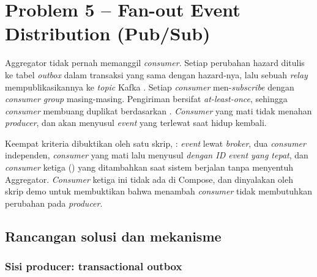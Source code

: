\chapter{Problem 5 -- Fan-out Event Distribution \mbox{(Pub/Sub)}}

\begin{ringkas}
Aggregator tidak pernah memanggil \emph{consumer}. Setiap perubahan hazard ditulis ke tabel \emph{outbox} dalam
transaksi yang sama dengan hazard-nya, lalu sebuah \emph{relay} mempublikasikannya ke \emph{topic} Kafka .
Setiap \emph{consumer} men-\emph{subscribe} dengan \emph{consumer group} masing-masing. Pengiriman bersifat \emph{at-least-once},
sehingga \emph{consumer} membuang duplikat berdasarkan . \emph{Consumer} yang mati tidak menahan \emph{producer}, dan akan
menyusul \emph{event} yang terlewat saat hidup kembali.
\end{ringkas}

\begin{catatan}
Keempat kriteria dibuktikan oleh satu skrip, : \emph{event} lewat \emph{broker}, dua \emph{consumer} independen, \emph{consumer}
yang mati lalu menyusul \emph{dengan ID event yang tepat}, dan \emph{consumer} ketiga () yang ditambahkan
saat sistem berjalan tanpa menyentuh Aggregator. \emph{Consumer} ketiga ini tidak ada di Compose, dan dinyalakan oleh skrip
demo untuk membuktikan bahwa menambah \emph{consumer} tidak membutuhkan perubahan pada \emph{producer}.
\end{catatan}

\section{Rancangan solusi dan mekanisme}



\subsection{Sisi producer: transactional outbox}

